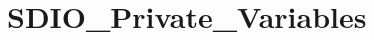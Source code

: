 \hypertarget{group___s_d_i_o___private___variables}{\section{S\-D\-I\-O\-\_\-\-Private\-\_\-\-Variables}
\label{group___s_d_i_o___private___variables}
}
